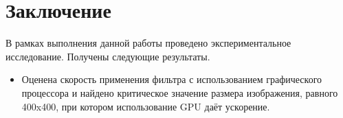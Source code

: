 
\section*{Заключение}
В рамках выполнения данной работы проведено экспериментальное исследование. Получены следующие результаты.
\begin{itemize}
    \item Оценена скорость применения фильтра с использованием графического процессора и найдено критическое значение размера изображения, равного 400x400, при котором использование GPU даёт ускорение.
\end{itemize}